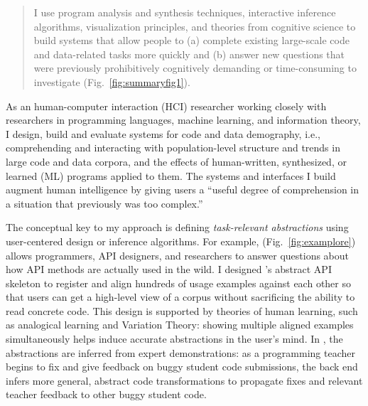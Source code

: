 \documentclass[justified]{tufte-handout}
\begin{document}
\begin{abstract}
I use program analysis and synthesis techniques, interactive inference algorithms, visualization principles, and theories from cognitive science to build systems that allow people to (a) complete existing large-scale code and data-related tasks more quickly and (b) answer new questions that were previously prohibitively cognitively demanding or time-consuming to investigate (Fig.~\ref{fig:summaryfig1}). %
\end{abstract}
As an human-computer interaction (HCI) researcher working closely with researchers in programming languages, machine learning, and information theory, I design, build and evaluate systems for code and data demography, i.e., comprehending and interacting with population-level structure and trends in large code and data corpora, and the effects of human-written, synthesized, or learned (ML) programs applied to them. 
The systems and interfaces I build augment human intelligence by giving users a ``useful degree of comprehension in a situation that previously was too complex.''\cite{engelbart1962} 

The conceptual key to my approach is defining \emph{task-relevant abstractions} using user-centered design or inference algorithms. For example,  (Fig.~\ref{fig:examplore}) allows programmers, API designers, and researchers to answer questions about how API methods are actually used in the wild.\cite{examplore} I designed 's abstract API skeleton to register and align hundreds of usage examples against each other so that users can get a high-level view of a corpus without sacrificing the ability to read concrete code. This design is supported by theories of human learning, such as analogical learning and Variation Theory: showing multiple aligned examples simultaneously helps induce accurate abstractions in the user's mind. In , the abstractions are inferred from expert demonstrations: as a programming teacher begins to fix and give feedback on buggy student code submissions, the back end infers more general, abstract code transformations to propagate fixes and relevant teacher feedback to other buggy student code.\cite{lats17} 
\end{document}
